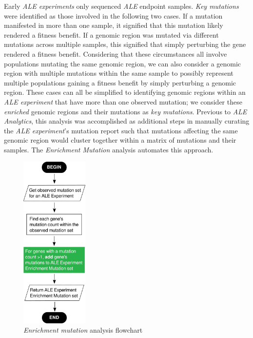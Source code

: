 \documentclass[12pt,final,masters,chapterheads]{ucsd}  %
\begin{document}
Early \textit{ALE experiments} only sequenced \textit{ALE} endpoint samples. \textit{Key mutations} were identified as those involved in the following two cases. If a mutation manifested in more than one sample, it signified that this mutation likely rendered a fitness benefit. If a genomic region was mutated via different mutations across multiple samples, this signified that simply perturbing the gene rendered a fitness benefit. Considering that these circumstances all involve populations mutating the same genomic region, we can also consider a genomic region with multiple mutations within the same sample to possibly represent multiple populations gaining a fitness benefit by simply perturbing a genomic region. These cases can all be simplified to identifying genomic regions within an \textit{ALE experiment} that have more than one observed mutation; we consider these \textit{enriched} genomic regions and their mutations as \textit{key mutations}. Previous to \textit{ALE Analytics}, this analysis was accomplished as additional steps in manually curating the \textit{ALE experiment}'s mutation report such that mutations affecting the same genomic region would cluster together within a matrix of mutations and their samples. The \textit{Enrichment Mutation} analysis automates this approach.

\begin{figure}[H]
  \caption{\textit{Enrichment mutation} analysis flowchart}
  \centering
  \includegraphics[width=0.3\textwidth]{enrichment_mutation_flowchart.png}
\end{figure}
\end{document}
